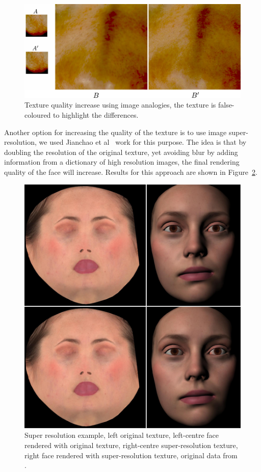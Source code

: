 \documentclass[11pt]{report}
\begin{document}
\begin{figure}[htbp!]
\centering
\includegraphics[width=\textwidth]{img/texture_synthesis}
	\caption{ Texture quality increase using image analogies, the texture is false-coloured to highlight the differences.}
	\label{fig:texture_synthesis}
\end{figure}

Another option for increasing the quality of the texture is to use image super-resolution, we used Jianchao et al~\cite{Jianchao2010} work for this purpose.
The idea is that by doubling the resolution of the original texture, yet avoiding blur by adding information from a dictionary of high resolution images, the final rendering quality of the face will increase.
Results for this approach are shown in Figure~\ref{fig:emily_super_resolution}.

\begin{figure}[htbp!]
\centering
\includegraphics[width=\textwidth]{img/emily_super_resolution}
	\caption{ Super resolution example, left original texture, left-centre face rendered with original texture, right-centre super-resolution texture, right face rendered with super-resolution texture, original data from \cite{FaceWareWeb}.}
	\label{fig:emily_super_resolution}
\end{figure}
\end{document}

